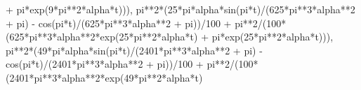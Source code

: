 \documentclass[
  11pt,
]{article}
\newenvironment{Shaded}{}{}
\newcommand{\DecValTok}[1]{\textcolor[rgb]{0.25,0.63,0.44}{#1}}
\newcommand{\NormalTok}[1]{#1}
\newcommand{\OperatorTok}[1]{\textcolor[rgb]{0.40,0.40,0.40}{#1}}
\begin{document}
\begin{Shaded}
\begin{Highlighting}[]
            \OperatorTok{+}\NormalTok{ pi}\OperatorTok{*}\NormalTok{exp(}\DecValTok{9}\OperatorTok{*}\NormalTok{pi}\OperatorTok{**}\DecValTok{2}\OperatorTok{*}\NormalTok{alpha}\OperatorTok{*}\NormalTok{t))), }
\NormalTok{        pi}\OperatorTok{**}\DecValTok{2}\OperatorTok{*}\NormalTok{(}\DecValTok{25}\OperatorTok{*}\NormalTok{pi}\OperatorTok{*}\NormalTok{alpha}\OperatorTok{*}\NormalTok{sin(pi}\OperatorTok{*}\NormalTok{t)}\OperatorTok{/}\NormalTok{(}\DecValTok{625}\OperatorTok{*}\NormalTok{pi}\OperatorTok{**}\DecValTok{3}\OperatorTok{*}\NormalTok{alpha}\OperatorTok{**}\DecValTok{2} \OperatorTok{+}\NormalTok{ pi) }
            \OperatorTok{{-}}\NormalTok{ cos(pi}\OperatorTok{*}\NormalTok{t)}\OperatorTok{/}\NormalTok{(}\DecValTok{625}\OperatorTok{*}\NormalTok{pi}\OperatorTok{**}\DecValTok{3}\OperatorTok{*}\NormalTok{alpha}\OperatorTok{**}\DecValTok{2} \OperatorTok{+}\NormalTok{ pi))}\OperatorTok{/}\DecValTok{100} 
            \OperatorTok{+}\NormalTok{ pi}\OperatorTok{**}\DecValTok{2}\OperatorTok{/}\NormalTok{(}\DecValTok{100}\OperatorTok{*}\NormalTok{(}\DecValTok{625}\OperatorTok{*}\NormalTok{pi}\OperatorTok{**}\DecValTok{3}\OperatorTok{*}\NormalTok{alpha}\OperatorTok{**}\DecValTok{2}\OperatorTok{*}\NormalTok{exp(}\DecValTok{25}\OperatorTok{*}\NormalTok{pi}\OperatorTok{**}\DecValTok{2}\OperatorTok{*}\NormalTok{alpha}\OperatorTok{*}\NormalTok{t) }
            \OperatorTok{+}\NormalTok{ pi}\OperatorTok{*}\NormalTok{exp(}\DecValTok{25}\OperatorTok{*}\NormalTok{pi}\OperatorTok{**}\DecValTok{2}\OperatorTok{*}\NormalTok{alpha}\OperatorTok{*}\NormalTok{t))), }
\NormalTok{        pi}\OperatorTok{**}\DecValTok{2}\OperatorTok{*}\NormalTok{(}\DecValTok{49}\OperatorTok{*}\NormalTok{pi}\OperatorTok{*}\NormalTok{alpha}\OperatorTok{*}\NormalTok{sin(pi}\OperatorTok{*}\NormalTok{t)}\OperatorTok{/}\NormalTok{(}\DecValTok{2401}\OperatorTok{*}\NormalTok{pi}\OperatorTok{**}\DecValTok{3}\OperatorTok{*}\NormalTok{alpha}\OperatorTok{**}\DecValTok{2} \OperatorTok{+}\NormalTok{ pi) }
            \OperatorTok{{-}}\NormalTok{ cos(pi}\OperatorTok{*}\NormalTok{t)}\OperatorTok{/}\NormalTok{(}\DecValTok{2401}\OperatorTok{*}\NormalTok{pi}\OperatorTok{**}\DecValTok{3}\OperatorTok{*}\NormalTok{alpha}\OperatorTok{**}\DecValTok{2} \OperatorTok{+}\NormalTok{ pi))}\OperatorTok{/}\DecValTok{100} 
            \OperatorTok{+}\NormalTok{ pi}\OperatorTok{**}\DecValTok{2}\OperatorTok{/}\NormalTok{(}\DecValTok{100}\OperatorTok{*}\NormalTok{(}\DecValTok{2401}\OperatorTok{*}\NormalTok{pi}\OperatorTok{**}\DecValTok{3}\OperatorTok{*}\NormalTok{alpha}\OperatorTok{**}\DecValTok{2}\OperatorTok{*}\NormalTok{exp(}\DecValTok{49}\OperatorTok{*}\NormalTok{pi}\OperatorTok{**}\DecValTok{2}\OperatorTok{*}\NormalTok{alpha}\OperatorTok{*}\NormalTok{t) }

\end{Highlighting}
\end{Shaded}
\end{document}

